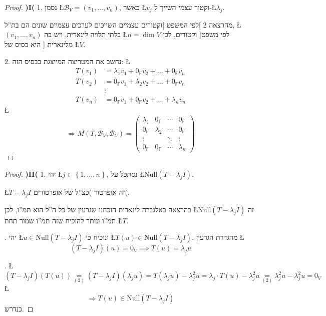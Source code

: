 \documentclass[english,hebrew]{article}
\begin{document}
\begin{proof}
\textbf{)I(} 1. נסמן \L{$\mathcal{B}_{V}=(v_{1},\dots,v_{n})$}, כאשר
\L{$v_{j}$} וקטור עצמי השייך ל-\L{$\lambda_{j}$}.

לפי המשפט {]}וקטורים עצמיים השייכים לערכים עצמיים שונים הם בת\textquotedblright ל{[}
מהרצאה 2, \L{$(v_{1},\dots,v_{n})$} בלתי תלויה לינארית, ויש בה \L{$n=\dim V$}
וקטורים, לכן {]}לפי משפט מלינארית {\endL}{[} היא בסיס של
\L{$V$}.

2. נחשב את המטריצה המייצגת בבסיס הזה: \L{%
\begin{align*}
T(v_{1}) & =\lambda_{1}v_{1}+0_{\mathbb{F}}v_{2}+\dots+0_{\mathbb{F}}v_{n}\\
T(v_{2}) & =0_{\mathbb{F}}v_{1}+\lambda_{2}v_{2}+\dots+0_{\mathbb{F}}v_{n}\\
 & \vdots\\
T(v_{n}) & =0_{\mathbb{F}}v_{1}+0_{\mathbb{F}}v_{2}+\dots+\lambda_{n}v_{n}
\end{align*}
}%
\L{%
\[
\Rightarrow M(T,\mathcal{B}_{V},\mathcal{B}_{V})=\begin{pmatrix}\lambda_{1} & 0_{\mathbb{F}} & \cdots & 0_{\mathbb{F}}\\
0_{\mathbb{F}} & \lambda_{2} & \cdots & 0_{\mathbb{F}}\\
\vdots &  & \ddots & \vdots\\
0_{\mathbb{F}} & 0_{\mathbb{F}} & \cdots & \lambda_{n}
\end{pmatrix}
\]
}%
\end{proof}
\begin{proof}
\textbf{)II(} 1. יהי \L{$j\in\left\{ 1,\dots,n\right\} $}, נסתכל
על \L{$\text{Null}(T-\lambda_{j}I)$}.

\L{$T-\lambda_{j}I$} זה אופרטור )כצ\textquotedblright ל של אופרטורים(.

בהרצאה {\endL} באלגברה לינארית {\endL} הוכחנו שגרעין
של כל ה\textquotedblright ל הוא תמ\textquotedblright ו, לכן \L{$\text{Null}(T-\lambda_{j}I)$}
זה תמ\textquotedblright ו ונותר להוכיח שזה תמ\textquotedblright ו
שמור תחת \L{$T$}.

{\endL}. יהי \L{$u\in\text{Null}(T-\lambda_{j}I)$} ונוכיח
כי \L{$T(u)\in\text{Null}(T-\lambda_{j}I)$}. מהגדרת הגרעין \L{%
\[
(T-\lambda_{j}I)(u)=0_{V}\implies T(u)=\lambda_{j}u
\]
}%

{\endL}. \L{%
\[
(T-\lambda_{j}I)\left(T(u)\right)\underset{(2)}{=}(T-\lambda_{j}I)(\lambda_{j}u)=T\left(\lambda_{j}u\right)-\lambda_{j}^{2}u=\lambda_{j}\cdot T\left(u\right)-\lambda_{j}^{2}u\underset{(2)}{=}\lambda_{j}^{2}u-\lambda_{j}^{2}u=0_{V}
\]
}%
\L{%
\[
\Rightarrow T(u)\in\text{Null}(T-\lambda_{j}I)
\]
}%
כנדרש.
\end{proof}
\end{document}
